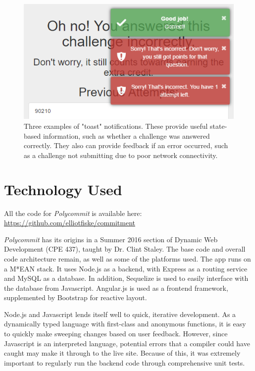 \begin{figure}
	\includegraphics{figures/pc-toast}
	\caption{Three examples of "toast" notifications. These provide useful state-based information, such as whether a challenge was answered correctly. They also can provide feedback if an error occurred, such as a challenge not submitting due to poor network connectivity.}
	\label{fig:polycommit6}
\end{figure}

\section{Technology Used}
\par All the code for \textit{Polycommit} is available here: 
\hyperref[https://github.com/elliotfiske/commitment]{https://github.com/elliotfiske/commitment}

\par \textit{Polycommit} has its origins in a Summer 2016 section of Dynamic Web Development (CPE 437), taught by Dr. Clint Staley. The base code and overall code architecture remain, as well as some of the platforms used. The app runs on a M*EAN stack. It uses Node.js as a backend, with Express as a routing service and MySQL as a database. In addition, Sequelize is used to easily interface with the database from Javascript. Angular.js is used as a frontend framework, supplemented by Bootstrap for reactive layout.

\par Node.js and Javascript lends itself well to quick, iterative development. As a dynamically typed language with first-class and anonymous functions, it is easy to quickly make sweeping changes based on user feedback. However, since Javascript is an interpreted language, potential errors that a compiler could have caught may make it through to the live site. Because of this, it was extremely important to regularly run the backend code through comprehensive unit tests.

